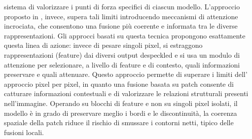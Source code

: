 sistema di valorizzare i punti di forza specifici di ciascun modello. L’approccio proposto in \cite{li2024crossfuse}, invece, 
supera tali limiti introducendo meccanismi di attenzione incrociata, che consentono una fusione più 
coerente e informata tra le diverse rappresentazioni.
Gli approcci basati su questa tecnica propongono esattamente questa linea di azione: 
invece di pesare singoli pixel, si estraggono rappresentazioni (feature) dai diversi output despeckled e si usa un modulo 
di attenzione per selezionare, a livello di feature e di contesto, quali informazioni preservare e quali attenuare. 
Questo approccio permette di superare i limiti dell' approccio pixel per pixel, in quanto una fusione basata su patch consente 
di catturare informazioni contestuali e di valorizzare le relazioni strutturali presenti nell’immagine. Operando 
su blocchi di feature e non su singoli pixel isolati, il modello è in grado di preservare meglio i bordi e le 
discontinuità, la coerenza spaziale della patch riduce il rischio di smussare i contorni netti, tipico delle 
fusioni locali.